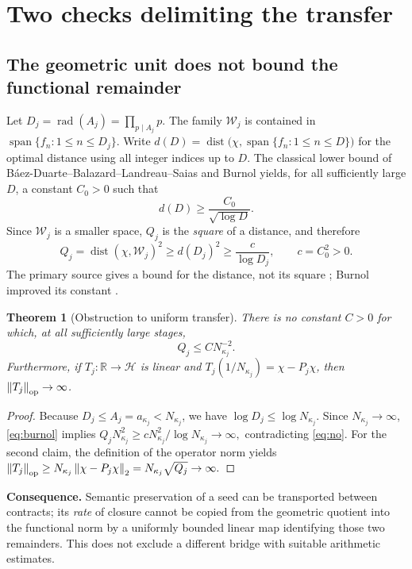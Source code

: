\documentclass[11pt,a4paper]{article}
\theoremstyle{mine}
\newtheorem{theorem}{Theorem}[section]
\theoremstyle{definition}
\newcommand{\HH}{\mathcal H}
\newcommand{\WW}{\mathcal W}
\newcommand{\RR}{\mathbb R}
\newcommand{\norm}[1]{\left\lVert#1\right\rVert}
\newcommand{\rad}{\operatorname{rad}}
\newcommand{\dist}{\operatorname{dist}}
\begin{document}
\section{Two checks delimiting the transfer}

\subsection{The geometric unit does not bound the functional remainder}

Let $D_j=\rad(A_j)=\prod_{p\mid A_j}p$. The family $\WW_j$ is contained in $\operatorname{span}\{f_n:1\le n\le D_j\}$. Write
$d(D)=\dist\bigl(\chi,\operatorname{span}\{f_n:1\le n\le D\}\bigr)$
for the optimal distance using all integer indices up to $D$. The classical lower bound of B\'aez-Duarte--Balazard--Landreau--Saias and Burnol yields, for all sufficiently large $D$, a constant $C_0>0$ such that
\[
d(D)\ge\frac{C_0}{\sqrt{\log D}}.
\]
Since $\WW_j$ is a smaller space, $Q_j$ is the \emph{square} of a distance, and therefore
\begin{equation}\label{eq:burnol}
Q_j=\dist(\chi,\WW_j)^2\ge d(D_j)^2\ge \frac{c}{\log D_j},\qquad c=C_0^2>0.
\end{equation}
The primary source gives a bound for the distance, not its square \cite[\S1, Eq.~(1.2)]{BD2003}; Burnol improved its constant \cite{Burnol}.

\begin{theorem}[Obstruction to uniform transfer]\label{th:nogo}
There is no constant $C>0$ for which, at all sufficiently large stages,
\begin{equation}\label{eq:no}\boxed{Q_j\le C N_{\kappa_j}^{-2}.}\end{equation}
Furthermore, if $T_j:\RR\to\HH$ is linear and $T_j(1/N_{\kappa_j})=\chi-P_j\chi$, then $\norm{T_j}_{\rm op}\to\infty$.
\end{theorem}
\begin{proof}
Because $D_j\le A_j=a_{\kappa_j}<N_{\kappa_j}$, we have $\log D_j\le\log N_{\kappa_j}$. Since $N_{\kappa_j}\to\infty$, \eqref{eq:burnol} implies
\(
Q_jN_{\kappa_j}^2\ge cN_{\kappa_j}^2/\log N_{\kappa_j}\to\infty,
\)
contradicting \eqref{eq:no}. For the second claim, the definition of the operator norm yields
\(
\norm{T_j}_{\rm op}\ge N_{\kappa_j}\norm{\chi-P_j\chi}_2=N_{\kappa_j}\sqrt{Q_j}\to\infty.
\)
\end{proof}

\textbf{Consequence.} Semantic preservation of a seed can be transported between contracts; its \emph{rate} of closure cannot be copied from the geometric quotient into the functional norm by a uniformly bounded linear map identifying those two remainders. This does not exclude a different bridge with suitable arithmetic estimates.
\end{document}
